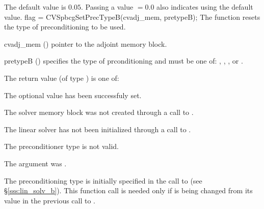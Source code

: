 {
  The default value is $0.05$.
  Passing a value $ = 0.0$ also indicates using the default value.
}
{
  flag = CVSpbcgSetPrecTypeB(cvadj\_mem, pretypeB);
}
{
  The function  resets the type
  of preconditioning to be used.
}
{
  \begin{args}
  \item[cvadj\_mem] ()
    pointer to the adjoint memory block.
  \item[pretypeB] ()
    specifies the type of prconditioning and must be one of:
    , , , or .
  \end{args}
}
{
  The return value  (of type ) is one of:
  \begin{args}
  \item[\Id{CVSPGMR\_SUCCESS}] 
    The optional value has been successfuly set.
  \item[\Id{CVSPGMR\_MEM\_NULL}]
    The {\cvodes} solver memory block was not created through a call to .
  \item[\Id{CVSPGMR\_LMEM\_NULL}]
    The {\cvspbcg} linear solver has not been initialized through a call to .
  \item[\Id{CVSPGMR\_ILL\_INPUT}]
    The preconditioner type  is not valid.
  \item[\Id{CVSPGMR\_ADJMEM\_NULL}]
    The  argument was .
  \end{args}
}
{
  The preconditioning type is initially specified in the call
  to  (see \S\ref{sss:lin_solv_b}). This function call is
  needed only if  is being changed from its value in the
  previous call to .
}


